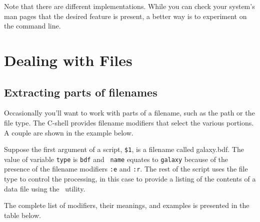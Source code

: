\documentclass[twoside,11pt,nolof]{starlink}
\providecommand{\HDSTRACEref}{\xref{{\footnotesize HDSTRACE}\normalsize}{sun102}{}}
\begin{document}
Note that there are different implementations.  While you can check
your system's man pages that the desired feature is present, a better
way is to experiment on the command line.

\newpage
\section{Dealing with Files\label{sc4_se_files}}


\subsection{Extracting parts of filenames
\label{sc4_se_filename_ext}}

Occasionally you'll want to work with parts of a filename, such as the
path or the file type.  The C-shell provides \textsf{filename modifiers}
that select the various portions.  A couple are shown in the example
below.

\begin{small}
\end{small}

Suppose the first argument of a script, \texttt{\$1}, is a filename called
galaxy.bdf.  The value of variable \texttt{type} is \texttt{bdf} and {\tt
name} equates to \texttt{galaxy} because of the presence of the filename
modifiers \texttt{:e} and \texttt{:r}.  The rest of the script uses the
file type to control the processing, in this case to provide a listing
of the contents of a data file using the \HDSTRACEref\normalsize\ utility.

The complete list of modifiers, their meanings, and examples is
presented in the table below.
\bigskip
\end{document}

